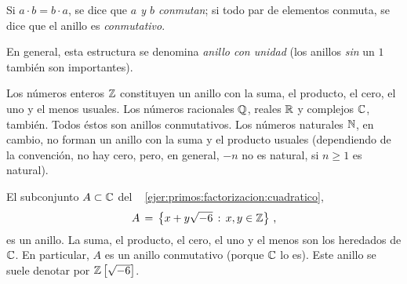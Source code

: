\begin{defEuclidianos}\label{def:euclidianos:conmutativo}
	Si $a\cdot b=b\cdot a$, se dice que \emph{$a$ y $b$ conmutan};
	si todo par de elementos conmuta, se dice que el anillo es
	\emph{conmutativo}.
\end{defEuclidianos}

\begin{obsEuclidianos}\label{obs:euclidianos}
	En general, esta estructura se denomina \emph{anillo con unidad}
	(los anillos \emph{sin} un $1$ tambi\'en son importantes).
\end{obsEuclidianos}

\begin{ejemEuclidianos}\label{ejem:euclidianos}
	Los n\'umeros enteros $\mathbb{Z}$ constituyen un anillo con la suma,
	el producto, el cero, el uno y el menos usuales. Los n\'umeros
	racionales $\mathbb{Q}$, reales $\mathbb{R}$ y complejos $\mathbb{C}$,
	tambi\'en. Todos \'estos son anillos conmutativos.
	Los n\'umeros naturales $\mathbb{N}$, en cambio, no forman un anillo
	con la suma y el producto usuales (dependiendo de la convenci\'on,
	no hay cero, pero, en general, $-n$ no es natural, si $n\geq 1$ es
	natural).
\end{ejemEuclidianos}


\begin{ejemEuclidianos}\label{ejem:euclidianos:cuadratico}
	El subconjunto $A\subset\mathbb{C}$ del \ejername~%
	\ref{ejer:primos:factorizacion:cuadratico},
	\begin{displaymath}
		A\,=\,\big\{x+y\sqrt{-6}\,:\,x,y\in\mathbb{Z}\big\}
		\text{ ,}
	\end{displaymath}
	es un anillo. La suma, el producto, el cero, el uno y el menos son
	los heredados de $\mathbb{C}$. En particular, $A$ es un anillo
	conmutativo (porque $\mathbb{C}$ lo es). Este anillo se suele denotar
	por ${\mathbb{Z}}\left[\sqrt{-6}\right]$.
\end{ejemEuclidianos}

